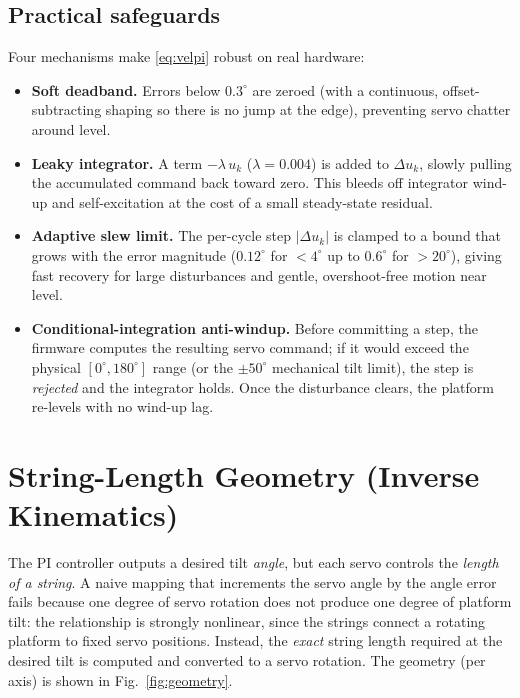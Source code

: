 \documentclass[conference]{IEEEtran}
\begin{document}
\subsection{Practical safeguards}
Four mechanisms make \eqref{eq:velpi} robust on real hardware:
\begin{itemize}
  \item \textbf{Soft deadband.} Errors below $0.3^\circ$ are zeroed (with a
        continuous, offset-subtracting shaping so there is no jump at the edge),
        preventing servo chatter around level.
  \item \textbf{Leaky integrator.} A term $-\lambda\,u_k$ ($\lambda=0.004$) is
        added to $\Delta u_k$, slowly pulling the accumulated command back
        toward zero. This bleeds off integrator wind-up and self-excitation at
        the cost of a small steady-state residual.
  \item \textbf{Adaptive slew limit.} The per-cycle step $|\Delta u_k|$ is
        clamped to a bound that grows with the error magnitude
        ($0.12^\circ$ for $<\!4^\circ$ up to $0.6^\circ$ for $>\!20^\circ$),
        giving fast recovery for large disturbances and gentle, overshoot-free
        motion near level.
  \item \textbf{Conditional-integration anti-windup.} Before committing a step,
        the firmware computes the resulting servo command; if it would exceed
        the physical $[0^\circ,180^\circ]$ range (or the $\pm50^\circ$
        mechanical tilt limit), the step is \emph{rejected} and the integrator
        holds. Once the disturbance clears, the platform re-levels with no
        wind-up lag.
\end{itemize}

\section{String-Length Geometry (Inverse Kinematics)}
\label{sec:geometry}
The PI controller outputs a desired tilt \emph{angle}, but each servo controls
the \emph{length of a string}. A naive mapping that increments the servo angle by
the angle error fails because one degree of servo rotation does not produce one
degree of platform tilt: the relationship is strongly nonlinear, since the
strings connect a rotating platform to fixed servo positions. Instead, the \emph{exact}
string length required at the desired tilt is computed and converted to a servo rotation.
The geometry (per axis) is shown in
Fig.~\ref{fig:geometry}.
\end{document}

